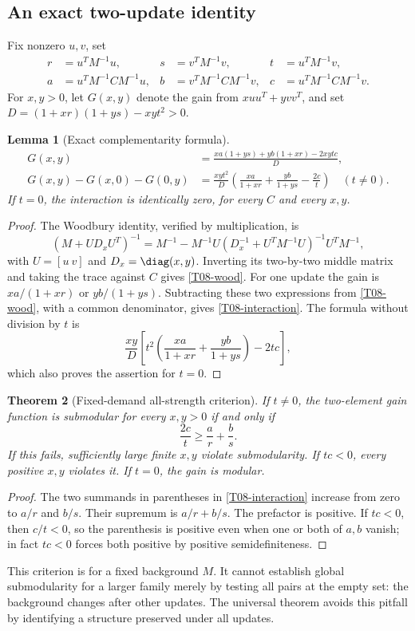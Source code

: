 \documentclass[11pt,a4paper]{article}
\newtheorem{theorem}{Theorem}[section]
\newtheorem{lemma}[theorem]{Lemma}
\theoremstyle{definition}\newtheorem{definition}[theorem]{Definition}
\theoremstyle{remark}\newtheorem{remark}[theorem]{Remark}
\numberwithin{equation}{section}
\begin{document}
\subsection{An exact two-update identity}\label{T08-sec-2}
Fix nonzero $u,v$, set
\begin{align*}
 r&=u^TM^{-1}u,&s&=v^TM^{-1}v,&t&=u^TM^{-1}v,\\
 a&=u^TM^{-1}CM^{-1}u,&b&=v^TM^{-1}CM^{-1}v,&c&=u^TM^{-1}CM^{-1}v.
\end{align*}
For $x,y>0$, let $G(x,y)$ denote the gain from $xuu^T+yvv^T$, and set
$D=(1+xr)(1+ys)-xy t^2>0$.
\begin{lemma}[Exact complementarity formula]\label{T08-two}
\begin{align}
 G(x,y)&=\frac{xa(1+ys)+yb(1+xr)-2xy tc}{D},\label{T08-wood}\\
 G(x,y)-G(x,0)-G(0,y)
 &=\frac{xy t^2}{D}\left(\frac{xa}{1+xr}+\frac{yb}{1+ys}-\frac{2c}{t}\right)\quad(t\ne0).\label{T08-interaction}
\end{align}
If $t=0$, the interaction is identically zero, for every $C$ and every $x,y$.
\end{lemma}
\begin{proof}
The Woodbury identity, verified by multiplication, is
\[
 (M+UD_xU^T)^{-1}=M^{-1}-M^{-1}U(D_x^{-1}+U^TM^{-1}U)^{-1}U^TM^{-1},
\]
with $U=[u\ v]$ and $D_x=\diag(x,y)$. Inverting its two-by-two middle matrix and taking the trace against $C$ gives \eqref{T08-wood}. For one update the gain is $xa/(1+xr)$ or $yb/(1+ys)$. Subtracting these two expressions from \eqref{T08-wood}, with a common denominator, gives \eqref{T08-interaction}. The formula without division by $t$ is
\[
 \frac{xy}{D}\left[t^2\left(\frac{xa}{1+xr}+\frac{yb}{1+ys}\right)-2tc\right],
\]
which also proves the assertion for $t=0$.
\end{proof}
\begin{theorem}[Fixed-demand all-strength criterion]\label{T08-fixed}
If $t\ne0$, the two-element gain function is submodular for every $x,y>0$ if and only if
\[
 \frac{2c}{t}\ge\frac ar+\frac bs.
\]
If this fails, sufficiently large finite $x,y$ violate submodularity. If $tc<0$, every positive $x,y$ violates it. If $t=0$, the gain is modular.
\end{theorem}
\begin{proof}
The two summands in parentheses in \eqref{T08-interaction} increase from zero to $a/r$ and $b/s$. Their supremum is $a/r+b/s$. The prefactor is positive. If $tc<0$, then $c/t<0$, so the parenthesis is positive even when one or both of $a,b$ vanish; in fact $tc<0$ forces both positive by positive semidefiniteness.
\end{proof}
This criterion is for a fixed background $M$. It cannot establish global submodularity for a larger family merely by testing all pairs at the empty set: the background changes after other updates. The universal theorem avoids this pitfall by identifying a structure preserved under all updates.
\end{document}
